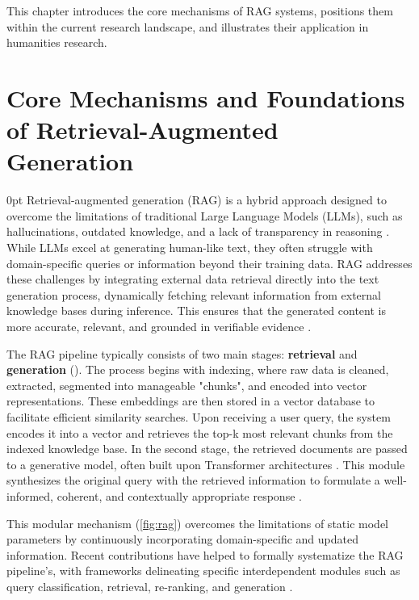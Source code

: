 \begin{spacing}{1.5}
This chapter introduces the core mechanisms of RAG systems, positions them within the current research landscape, and illustrates their application in humanities research.

\section{Core Mechanisms and Foundations of Retrieval-Augmented Generation}\setlength{\parskip}
{0pt}
Retrieval-augmented generation (RAG) is a hybrid approach designed to overcome the limitations of traditional Large Language Models (LLMs), such as hallucinations, outdated knowledge, and a lack of transparency in reasoning \parencite{gao_retrieval-augmented_2024, arslan_survey_2024, gupta_comprehensive_2024}. While LLMs excel at generating human-like text, they often struggle with domain-specific queries or information beyond their training data. RAG addresses these challenges by integrating external data retrieval directly into the text generation process, dynamically fetching relevant information from external knowledge bases during inference. This ensures that the generated content is more accurate, relevant, and grounded in verifiable evidence \citep{arslan_survey_2024, lewis_retrieval-augmented_2020}.

The RAG pipeline typically consists of two main stages: \textbf{retrieval} and \textbf{generation} (\cite{odsc-community_retrieval-augmented_2024}). The process begins with indexing, where raw data is cleaned, extracted, segmented into manageable "chunks", and encoded into vector representations. These embeddings are then stored in a vector database to facilitate efficient similarity searches. Upon receiving a user query, the system encodes it into a vector and retrieves the top-k most relevant chunks from the indexed knowledge base. In the second stage, the retrieved documents are passed to a generative model, often built upon Transformer architectures \citep{vaswani_attention_2017}. This module synthesizes the original query with the retrieved information to formulate a well-informed, coherent, and contextually appropriate response \citep{arslan_survey_2024}.

This modular mechanism (\autoref{fig:rag}) overcomes the limitations of static model parameters by continuously incorporating domain-specific and updated information. Recent contributions have helped to formally systematize the RAG pipeline's, with frameworks delineating specific interdependent modules such as query classification, retrieval, re-ranking, and generation \parencite{wang_searching_2024}.


\end{spacing}
